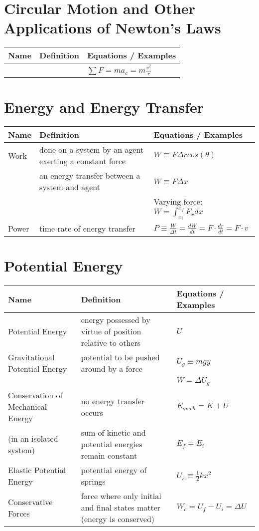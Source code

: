 \documentclass[11pt]{article}
\begin{document}
\section{Circular Motion and Other Applications of Newton's Laws}
\begin{tabularx}{\textwidth}{l| X l}
    Name & Definition & Equations / Examples \\ \hline
         & & $ \sum{F} = ma_{c} = m\frac{v^2}{r} $ \\ \hline
\end{tabularx}

\section{Energy and Energy Transfer}
\begin{tabularx}{\textwidth}{l| X l}
    Name & Definition & Equations / Examples \\ \hline
    Work & done on a system by an agent exerting a constant force & $ W \equiv F\Delta{r}cos(\theta) $ \\* & an energy transfer between a system and agent & $ W \equiv F\Delta{x} $ \\* & & Varying force: $ W = \int_{x_{i}}^{x_{f}} F_{x}dx $ \bigstrut \\ \hline 
    Power & time rate of energy transfer & $ P \equiv \frac{W}{\Delta t} = \frac{dW}{dt} = F \cdot \frac{dr}{dt} = F \cdot v $ \bigstrut \\ \hline
\end{tabularx}

\section{Potential Energy}
\begin{tabularx}{\textwidth}{l| X l}
    Name & Definition & Equations / Examples \\ \hline
    Potential Energy & energy possessed by virtue of position relative to others & $ U $ \\ \hline
    Gravitational Potential Energy & potential to be pushed around by a force & $ U_{g} \equiv mgy $ \\* & & $ W = \Delta U_{g} $ \\ \hline
    Conservation of Mechanical Energy & no energy transfer occurs &  $ E_{mech} = K + U $ \\*  (in an isolated system) &  sum of kinetic and potential energies remain constant & $ E_{f} = E_{i} $ \bigstrut \\ \hline
    Elastic Potential Energy & potential energy of springs & $ U_{s} \equiv \frac{1}{2}kx^2 $ \bigstrut \\ \hline
    Conservative Forces & force where only initial and final states matter (energy is conserved) & $ W_{c} = U_{f} - U_{i} = \Delta U $ \bigstrut \\ \hline
\end{tabularx}
\end{document}
